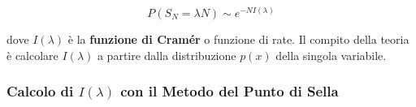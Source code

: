 \begin{tcolorbox}[colback=yellow!30,  
                  colframe=yellow!50!orange,  
                  boxrule=0.8pt, 
                  arc=3pt,  
                  top=4pt, bottom=4pt, left=6pt, right=6pt,
                  enhanced,
                  sharp corners=south]
\begin{equation}
 P(S_N = \lambda N) \sim e^{-N I(\lambda)}
\end{equation}
\end{tcolorbox}


dove $I(\lambda)$ è la \textbf{funzione di Cramér} o funzione di rate. Il compito della teoria è calcolare $I(\lambda)$ a partire dalla distribuzione $p(x)$ della singola variabile.

\subsubsection{Calcolo di $I(\lambda)$ con il Metodo del Punto di Sella}

